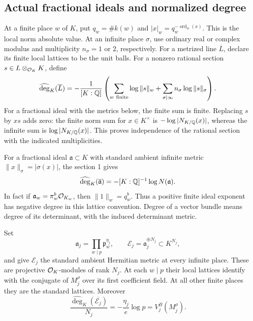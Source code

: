 \subsection{Actual fractional ideals and normalized degree}

At a finite place $w$ of $K$, put $q_w=\#k(w)$ and
$|x|_w=q_w^{-\operatorname{ord}_w(x)}$. This is the local norm
absolute value. At an infinite place $\sigma$, use ordinary real
or complex modulus and multiplicity $n_\sigma=1$ or $2$,
respectively. For a metrized line $\overline L$, declare its finite
local lattices to be the unit balls. For a nonzero rational section
$s\in L\otimes_{\mathcal O_K}K$, define
\begin{equation}\label{eq:ub-degree}
 \widehat{\deg}_K(\overline L)
 =-\frac1{[K:\mathbb Q]}
   \left(\sum_{w\ {\rm finite}}\log\|s\|_w+
         \sum_{\sigma\mid\infty}n_\sigma\log\|s\|_\sigma\right).
\end{equation}
For a fractional ideal with the metrics below, the finite sum is
finite. Replacing $s$ by $xs$ adds zero: the finite norm sum for
$x\in K^\times$ is $-\log|N_{K/\mathbb Q}(x)|$, whereas the infinite
sum is $\log|N_{K/\mathbb Q}(x)|$. This proves independence of the rational
section with the indicated multiplicities.

For a fractional ideal $\mathfrak a\subset K$ with standard ambient
infinite metric $\|x\|_\sigma=|\sigma(x)|$, the section 1 gives
\begin{equation}\label{eq:ub-ideal-degree}
 \widehat{\deg}_K(\overline{\mathfrak a})
          =-[K:\mathbb Q]^{-1}\log N(\mathfrak a).
\end{equation}
In fact if $\mathfrak a_w=\pi_w^b\mathcal O_{K_w}$, then
$\|1\|_w=q_w^b$. Thus a positive finite ideal exponent has negative
degree in this lattice convention. Degree of a vector bundle means
degree of its determinant, with the induced determinant metric.

\begin{theorem}
\label{thm:ub-realization}
Set
\begin{equation}\label{eq:ub-bundles}
 \mathfrak a_j=\prod_{w\mid p}\mathfrak p_w^{\eta_j},\qquad
 \mathcal E_j=\mathfrak a_j^{\oplus N_j}\subset K^{N_j},
\end{equation}
and give $\mathcal E_j$ the standard ambient Hermitian metric at
every infinite place. These are projective $\mathcal O_K$-modules of rank
$N_j$. At each $w\mid p$ their local lattices identify with the
conjugate of $M_j^\rho$ over its first coefficient field. At all
other finite places they are the standard lattices. Moreover
\begin{equation}\label{eq:ub-degree-volume}
 \frac{\widehat{\deg}_K(\overline{\mathcal E_j})}{N_j}
       =-\frac{\eta_j}{e}\log p
       =V_j^B(M_j^\rho).
\end{equation}
\end{theorem}

